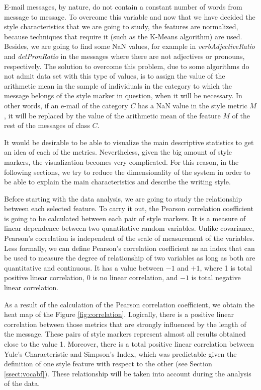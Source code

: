 E-mail messages, by nature, do not contain a constant number of words from message to message. To overcome this variable and now that we have decided the style characteristics that we are going to study, the features are normalized, because techniques that require it (such as the K-Means algorithm) are used. Besides, we are going to find some NaN values, for example in \textit{verbAdjectiveRatio} and \textit{detPronRatio} in the messages where there are not adjectives or pronouns, respectively. The solution to overcome this problem, due to some algorithms do not admit data set with this type of values, is to assign the value of the arithmetic mean in the sample of individuals in the category to which the message belongs of the style marker in question, when it will be necessary. In other words, if an e-mail of the category $C$ has a NaN value in the style metric $M$, it will be replaced by the value of the arithmetic mean of the feature $M$ of the rest of the messages of class $C$.

It would be desirable to be able to visualize the main descriptive statistics to get an idea of each of the metrics. Nevertheless, given the big amount of style markers, the visualization becomes very complicated. For this reason, in the following sections, we try to reduce the dimensionality of the system in order to be able to explain the main characteristics and describe the writing style.

Before starting with the data analysis, we are going to study the relationship between each selected feature. To carry it out, the Pearson correlation coefficient \citep{benesty2009pearson} is going to be calculated between each pair of style markers. It is a measure of linear dependence between two quantitative random variables. Unlike covariance, Pearson's correlation is independent of the scale of measurement of the variables. Less formally, we can define Pearson's correlation coefficient as an index that can be used to measure the degree of relationship of two variables as long as both are quantitative and continuous. It has a value between $-1$ and $+1$, where 1 is total positive linear correlation, $0$ is no linear correlation, and $-1$ is total negative linear correlation.

As a result of the calculation of the Pearson correlation coefficient, we obtain the heat map of the Figure \ref{fig:correlation}. Logically, there is a positive linear correlation between those metrics that are strongly influenced by the length of the message. These pairs of style markers represent almost all results obtained close to the value 1. Moreover, there is a total positive linear correlation between Yule's Characteristic and Simpson's Index, which was predictable given the definition of one style feature with respect to the other (see Section \ref{ssect:vocabf}). These relationship will be taken into account during the analysis of the data.